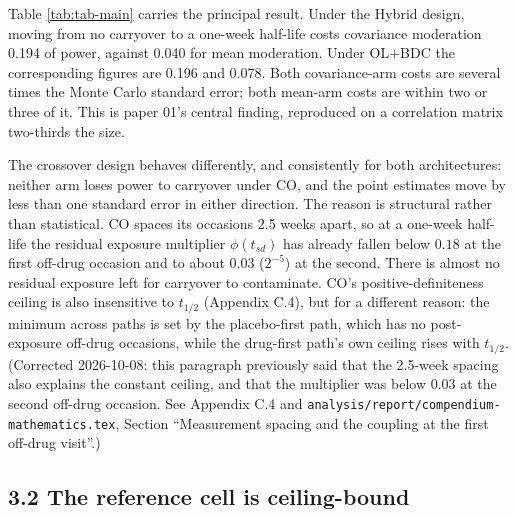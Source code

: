 \documentclass[
  11pt,
]{article}
\begin{document}
Table \ref{tab:tab-main} carries the principal result. Under the
Hybrid design, moving from no carryover to a one-week half-life costs
covariance moderation
0.194
of power, against
0.040
for mean moderation. Under OL+BDC the corresponding figures are
0.196
and
0.078.
Both covariance-arm costs are several times the Monte Carlo standard
error; both mean-arm costs are within two or three of it. This is
paper 01's central finding, reproduced on a correlation matrix
two-thirds the size.

The crossover design behaves differently, and consistently for both
architectures: neither arm loses power to carryover under CO, and the
point estimates move by less than one standard error in either
direction. The reason is structural rather than statistical. CO
spaces its occasions 2.5 weeks apart, so at a one-week half-life the
residual exposure multiplier \(\phi(t_{sd})\) has already fallen below
\(0.18\) at the first off-drug occasion and to about \(0.03\) (\(2^{-5}\))
at the second.
There is almost no residual exposure left for carryover to
contaminate. CO's positive-definiteness ceiling is also insensitive to
\(t_{1/2}\) (Appendix C.4), but for a different reason: the minimum
across paths is set by the placebo-first path, which has no
post-exposure off-drug occasions, while the drug-first path's own
ceiling rises with \(t_{1/2}\). (Corrected 2026-10-08: this paragraph
previously said that the 2.5-week spacing also explains the constant
ceiling, and that the multiplier was below \(0.03\) at the second
off-drug occasion. See Appendix C.4 and
\texttt{analysis/report/compendium-mathematics.tex}, Section ``Measurement
spacing and the coupling at the first off-drug visit''.)

\subsection{3.2 The reference cell is ceiling-bound}

\begin{table}
\centering
\caption{\label{tab:tab-ref}The same comparison at paper 01's reference cell
    ($c_{bm} = 0.45$, $N = 70$). Every entry lies above $0.89$, so the
    architecture contrast is compressed by a ceiling effect and the
    carryover cost is understated.}
\centering
{}
\end{table}
\end{document}
